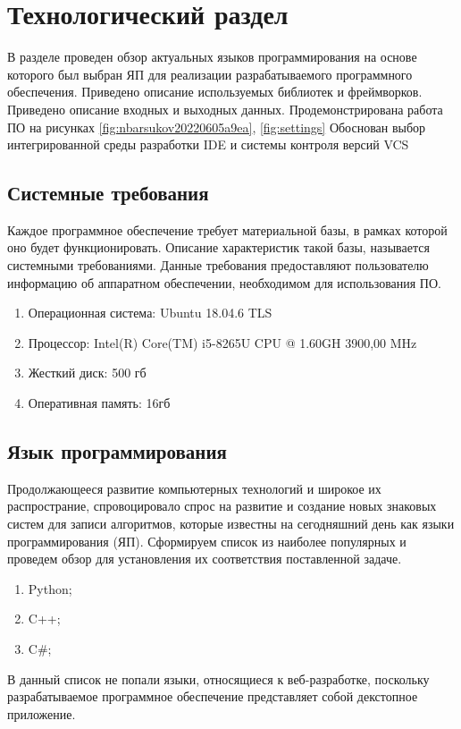 \chapter{Технологический раздел}
В разделе проведен обзор актуальных языков программирования на основе которого был выбран ЯП для реализации разрабатываемого программного обеспечения.
Приведено описание используемых библиотек и фреймворков.
Приведено описание входных и выходных данных. 
Продемонстрирована работа ПО на рисунках \ref{fig:nbarsukov20220605a9ea}, \ref{fig:settings}
Обоснован выбор интегрированной среды разработки IDE и системы контроля версий VCS

\section{Системные требования}
Каждое программное обеспечение требует материальной базы, в рамках которой оно будет функционировать.
Описание характеристик такой базы, называется системными требованиями.
Данные требования предоставляют пользователю информацию об аппаратном обеспечении, необходимом для использования ПО.
\begin{enumerate}
	\item Операционная система: Ubuntu 18.04.6 TLS
	\item Процессор: Intel(R) Core(TM) i5-8265U CPU @ 1.60GH	3900,00 MHz	
	\item Жесткий диск: 500 гб
	\item Оперативная память: 16гб
\end{enumerate}

\section{Язык программирования}
Продолжающееся развитие компьютерных технологий и широкое их распространие, спровоцировало спрос на развитие и создание новых знаковых систем для записи алгоритмов, которые известны на сегодняшний день как языки программирования (ЯП).
Сформируем список из наиболее популярных и проведем обзор для установления их соответствия поставленной задаче.
\begin{enumerate}
	\item Python;
	\item C++;
	\item C\#;
\end{enumerate}

В данный список не попали языки, относящиеся к веб-разработке, поскольку разрабатываемое программное обеспечение представляет собой декстопное приложение.


